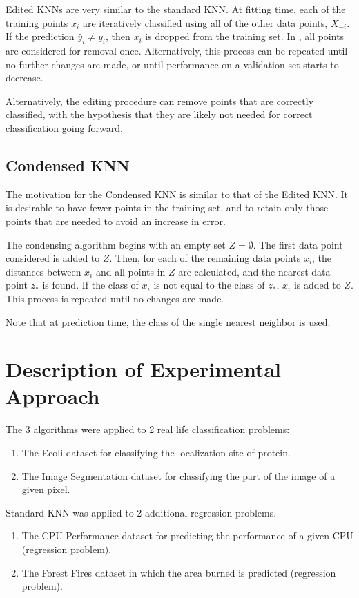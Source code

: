 \documentclass{amsart}
\begin{document}
    Edited KNNs\cite{edited_knn} are very similar to the standard KNN. At fitting time, each of the
    training points $x_i$ are iteratively classified using all of the other data points, $X_{-i}$.
    If the prediction $\hat{y}_i \neq y_i$, then $x_i$ is dropped from the training set. In \cite{edited_knn},
    all points are considered for removal once. Alternatively, this process can be
    repeated until no further changes are made, or until performance on a validation set
    starts to decrease.

    Alternatively, the editing procedure can remove points that are correctly classified, with the
    hypothesis that they are likely not needed for correct classification going forward.

    \subsection*{Condensed KNN}
    The motivation for the Condensed KNN is similar to that of the Edited KNN. It is desirable
    to have fewer points in the training set, and to retain only those points that are needed
    to avoid an increase in error.

    The condensing algorithm begins with an empty set $Z = \emptyset$. The first data point
    considered is added to $Z$. Then, for each of the remaining data points $x_i$,
    the distances between $x_i$ and all points in $Z$ are calculated, and the nearest data point $z_*$
    is found. If the class of $x_i$ is not equal to the class of $z_*$,
    $x_i$ is added to $Z$. This process is repeated until no changes are made.

    Note that at prediction time, the class of the single nearest neighbor is used.

    \section{Description of Experimental Approach}
    The 3 algorithms were applied to 2 real life classification problems:
    \begin{enumerate}
        \item The Ecoli dataset for classifying the localization site of protein.
        \item The Image Segmentation dataset for classifying the part of the image of a given pixel.
    \end{enumerate}
    Standard KNN was applied to 2 additional regression problems.
    \begin{enumerate}
        \item The CPU Performance dataset for predicting the performance of a given CPU (regression problem).
        \item The Forest Fires dataset in which the area burned is predicted (regression problem).
    \end{enumerate}
\end{document}
